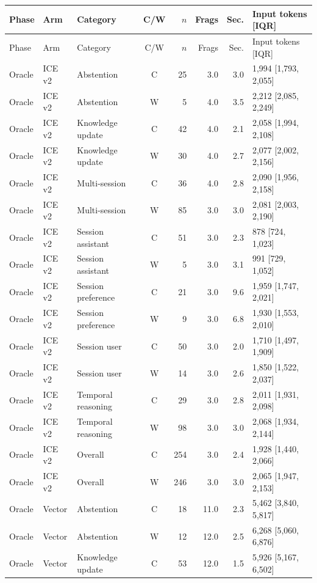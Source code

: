 \documentclass[twoside,11pt]{article}
\begin{document}
\begin{longtable}{@{}L{1.0cm}L{1.0cm}L{2.6cm}crrrL{3.6cm}@{}}
\toprule Phase & Arm & Category & C/W & $n$ & Frags & Sec. & Input tokens [IQR]\\\midrule\endfirsthead
\toprule Phase & Arm & Category & C/W & $n$ & Frags & Sec. & Input tokens [IQR]\\\midrule\endhead
Oracle & ICE v2 & Abstention & C & 25 & 3.0 & 3.0 & 1,994 [1,793, 2,055] \\
Oracle & ICE v2 & Abstention & W & 5 & 4.0 & 3.5 & 2,212 [2,085, 2,249] \\
Oracle & ICE v2 & Knowledge update & C & 42 & 4.0 & 2.1 & 2,058 [1,994, 2,108] \\
Oracle & ICE v2 & Knowledge update & W & 30 & 4.0 & 2.7 & 2,077 [2,002, 2,156] \\
Oracle & ICE v2 & Multi-session & C & 36 & 4.0 & 2.8 & 2,090 [1,956, 2,158] \\
Oracle & ICE v2 & Multi-session & W & 85 & 3.0 & 3.0 & 2,081 [2,003, 2,190] \\
Oracle & ICE v2 & Session assistant & C & 51 & 3.0 & 2.3 & 878 [724, 1,023] \\
Oracle & ICE v2 & Session assistant & W & 5 & 3.0 & 3.1 & 991 [729, 1,052] \\
Oracle & ICE v2 & Session preference & C & 21 & 3.0 & 9.6 & 1,959 [1,747, 2,021] \\
Oracle & ICE v2 & Session preference & W & 9 & 3.0 & 6.8 & 1,930 [1,553, 2,010] \\
Oracle & ICE v2 & Session user & C & 50 & 3.0 & 2.0 & 1,710 [1,497, 1,909] \\
Oracle & ICE v2 & Session user & W & 14 & 3.0 & 2.6 & 1,850 [1,522, 2,037] \\
Oracle & ICE v2 & Temporal reasoning & C & 29 & 3.0 & 2.8 & 2,011 [1,931, 2,098] \\
Oracle & ICE v2 & Temporal reasoning & W & 98 & 3.0 & 3.0 & 2,068 [1,934, 2,144] \\
Oracle & ICE v2 & Overall & C & 254 & 3.0 & 2.4 & 1,928 [1,440, 2,066] \\
Oracle & ICE v2 & Overall & W & 246 & 3.0 & 3.0 & 2,065 [1,947, 2,153] \\
Oracle & Vector & Abstention & C & 18 & 11.0 & 2.3 & 5,462 [3,840, 5,817] \\
Oracle & Vector & Abstention & W & 12 & 12.0 & 2.5 & 6,268 [5,060, 6,876] \\
Oracle & Vector & Knowledge update & C & 53 & 12.0 & 1.5 & 5,926 [5,167, 6,502] \\

\end{longtable}
\end{document}
